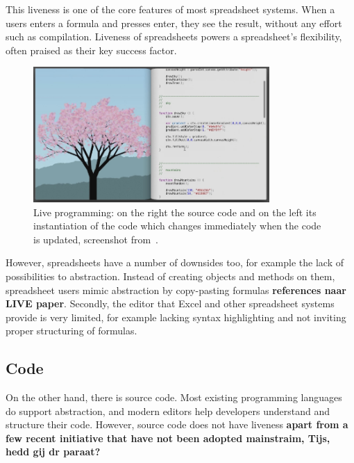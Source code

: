 \documentclass{llncs}
\newcommand{\todo}[1]{\textbf{#1}}
\begin{document}
This liveness is one of the core features of most spreadsheet systems. When a users enters a formula and presses enter, they see the result, without any effort such as compilation. Liveness of spreadsheets powers a spreadsheet's flexibility, often praised as their key success factor.

\begin{figure}
  \begin{center}
  \includegraphics[width=9cm]{fig/bret.png}
  \caption{Live programming: on the right the source code and on the left its instantiation of the code which changes immediately when the code is updated, screenshot from~\cite{Victor2012}.}
  \label{fig:bret}
  \end{center}
\end{figure} 

However, spreadsheets have a number of downsides too, for example the lack of possibilities to abstraction. Instead of creating objects and methods on them, spreadsheet users mimic abstraction by copy-pasting formulas \todo{references naar LIVE paper}. Secondly, the editor that Excel and other spreadsheet systems provide is very limited, for example lacking syntax highlighting and not inviting proper structuring of formulas. 

\subsection{Code}
On the other hand, there is source code. Most existing programming languages do support abstraction, and modern editors help developers understand and structure their code. However, source code does not have liveness \todo{apart from a few recent initiative that have not been adopted mainstraim, Tijs, hedd gij dr paraat?} 

\end{document}
